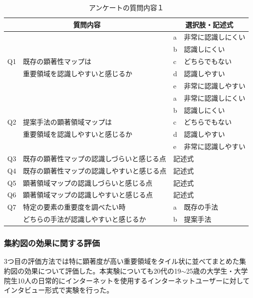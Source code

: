 \begin{table}[h]
  \caption{アンケートの質問内容１}
  \label{table:question01}
  \centering
  \begingroup
  \renewcommand{\arraystretch}{1} %
  \small
  \begin{tabular}{|l|l|l|l|}
    \hline
    \multicolumn{2}{|c|}{質問内容} & \multicolumn{2}{|c|}{選択肢・記述式} \\ \hline
    & & a & 非常に認識しにくい \\ \cline{3-4}
    & & b & 認識しにくい \\ \cline{3-4}
    Q1 & 既存の顕著性マップは & c & どちらでもない \\ \cline{3-4}
    & 重要領域を認識しやすいと感じるか & d & 認識しやすい \\ \cline{3-4}
    & & e & 非常に認識しやすい \\ \hline
    & & a & 非常に認識しにくい \\ \cline{3-4}
    & & b & 認識しにくい \\ \cline{3-4}
    Q2 & 提案手法の顕著領域マップは & c & どちらでもない \\ \cline{3-4}
    & 重要領域を認識しやすいと感じるか & d & 認識しやすい \\ \cline{3-4}
    & & e & 非常に認識しやすい \\ \hline
    Q3 & 既存の顕著性マップの認識しづらいと感じる点 & \multicolumn{2}{|l|}{記述式} \\ \hline
    Q4 & 既存の顕著性マップの認識しやすいと感じる点 & \multicolumn{2}{|l|}{記述式} \\ \hline
    Q5 & 顕著領域マップの認識しづらいと感じる点 & \multicolumn{2}{|l|}{記述式} \\ \hline
    Q6 & 顕著領域マップの認識しやすいと感じる点 & \multicolumn{2}{|l|}{記述式} \\ \hline
    Q7 & 特定の要素の重要度を調べたい時 & a & 既存の手法 \\ \cline{3-4}
    & どちらの手法が認識しやすいと感じるか  & b & 提案手法 \\ \hline
    \end{tabular}
    \endgroup
\end{table}


\subsubsection{集約図の効果に関する評価}
\par 3つ目の評価方法では特に顕著度が高い重要領域をタイル状に並べてまとめた集約図の効果について評価した。本実験についても20代の19$\sim$25歳の大学生・大学院生10人の日常的にインターネットを使用するインターネットユーザーに対してインタビュー形式で実験を行った。

